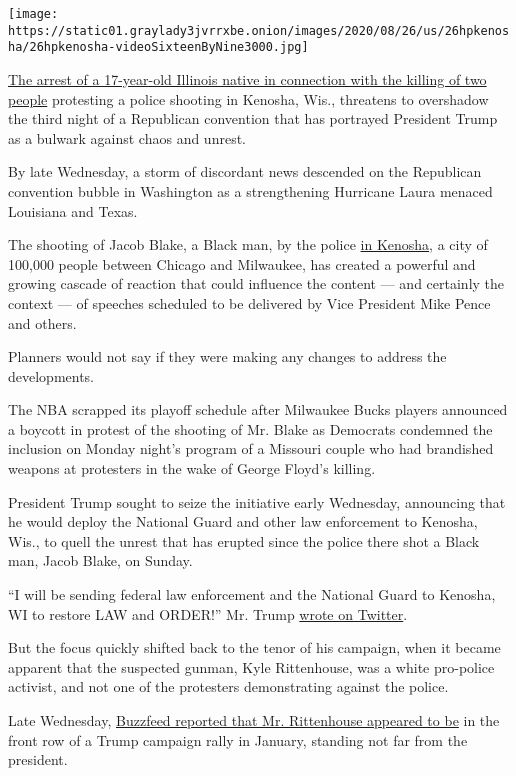 \texttt{[image: https://static01.graylady3jvrrxbe.onion/images/2020/08/26/us/26hpkenosha/26hpkenosha-videoSixteenByNine3000.jpg]}

\href{https://www.nytimes3xbfgragh.onion/2020/08/26/us/kenosha-shooting-protests-jacob-blake.html?action=click\&module=Top\%20Stories\&pgtype=Homepage}{The
arrest of a 17-year-old Illinois native in connection with the killing
of two people} protesting a police shooting in Kenosha, Wis., threatens
to overshadow the third night of a Republican convention that has
portrayed President Trump as a bulwark against chaos and unrest.

By late Wednesday, a storm of discordant news descended on the
Republican convention bubble in Washington as a strengthening Hurricane
Laura menaced Louisiana and Texas.

The shooting of Jacob Blake, a Black man, by the police
\href{https://www.nytimes3xbfgragh.onion/2020/08/25/us/jacob-blake-kenosha-fires.html}{in
Kenosha}, a city of 100,000 people between Chicago and Milwaukee, has
created a powerful and growing cascade of reaction that could influence
the content --- and certainly the context --- of speeches scheduled to
be delivered by Vice President Mike Pence and others.

Planners would not say if they were making any changes to address the
developments.

The NBA scrapped its playoff schedule after Milwaukee Bucks players
announced a boycott in protest of the shooting of Mr. Blake as Democrats
condemned the inclusion on Monday night's program of a Missouri couple
who had brandished weapons at protesters in the wake of George Floyd's
killing.

President Trump sought to seize the initiative early Wednesday,
announcing that he would deploy the National Guard and other law
enforcement to Kenosha, Wis., to quell the unrest that has erupted since
the police there shot a Black man, Jacob Blake, on Sunday.

``I will be sending federal law enforcement and the National Guard to
Kenosha, WI to restore LAW and ORDER!'' Mr. Trump
\href{https://twitter.com/realDonaldTrump/status/1298671449968959490}{wrote
on Twitter}.

But the focus quickly shifted back to the tenor of his campaign, when it
became apparent that the suspected gunman, Kyle Rittenhouse, was a white
pro-police activist, and not one of the protesters demonstrating against
the police.

Late Wednesday,
\href{https://www.buzzfeednews.com/article/ellievhall/kenosha-suspect-kyle-rittenhouse-trump-rally}{Buzzfeed
reported that Mr. Rittenhouse appeared to be} in the front row of a
Trump campaign rally in January, standing not far from the president.

